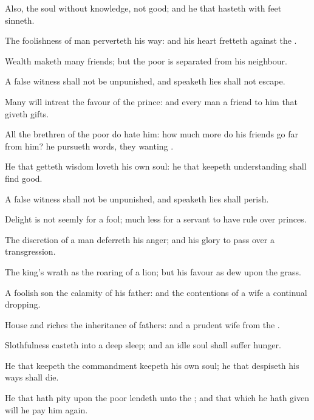 {Also,
{} the
soul
{} without
knowledge,
{} not
good; and he that
hasteth with
{}
feet
sinneth.

The
foolishness of
man
perverteth his
way: and his
heart
fretteth against the
{}.

Wealth
maketh
many
friends; but the
poor is
separated from his
neighbour.

A
false
witness shall not be
unpunished, and
{}
speaketh
lies shall not
escape.


\par }{\PP {}Many will
intreat the
favour of the
prince: and every man
{} a
friend to
him that giveth
gifts.

All the
brethren of the
poor do
hate him: how much more do his
friends go
far from him? he
pursueth
{}
words,
{} they
{} wanting
{}.

He that
getteth
wisdom
loveth his own
soul: he that
keepeth
understanding shall
find
good.

A
false
witness shall not be
unpunished, and
{}
speaketh
lies shall
perish.

Delight is not
seemly for a
fool; much less for a
servant to have
rule over
princes.

The
discretion of a
man
deferreth his
anger; and
{} his
glory to pass
over a
transgression.

The
king’s
wrath
{} as the
roaring of a
lion; but his
favour
{} as
dew upon the
grass.

A
foolish
son
{} the
calamity of his
father: and the
contentions of a
wife
{} a
continual
dropping.

House and
riches
{} the
inheritance of
fathers: and a
prudent
wife
{} from the
{}.

Slothfulness
casteth into a deep
sleep; and an
idle
soul shall suffer
hunger.

He that
keepeth the
commandment
keepeth his own
soul;
{} he that
despiseth his
ways shall
die.

He that hath
pity upon the
poor
lendeth unto the
{}; and that which he hath
given will he pay him
again.

}
